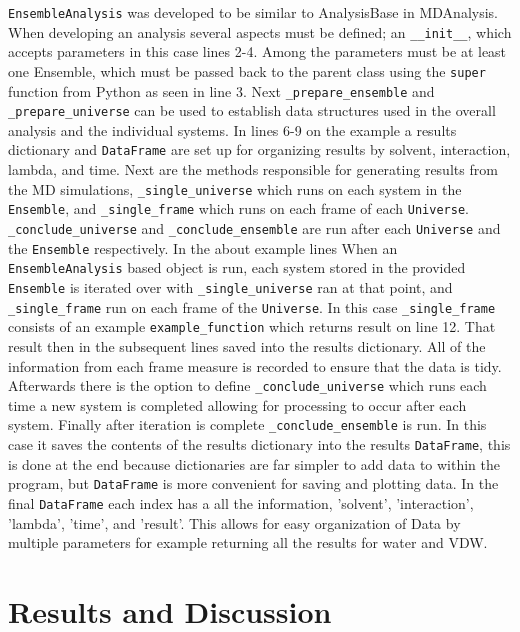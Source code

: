 \documentclass{article}[letterpaper, margins=1in, 12pt]
\begin{document}
\texttt{EnsembleAnalysis} was developed to be similar to AnalysisBase in MDAnalysis. When developing an analysis several aspects must be defined; an \lstinline{__init__}, which accepts parameters in this case lines 2-4. Among the parameters must be at least one Ensemble, which must be passed back to the parent class using the \lstinline{super} function from Python as seen in line 3. Next \lstinline{_prepare_ensemble} and \lstinline{_prepare_universe} can be used to establish data structures used in the overall analysis and the individual systems. In lines 6-9 on the example a results dictionary and \texttt{DataFrame} are set up for organizing results by solvent, interaction, lambda, and time. Next are the methods responsible for generating results from the MD simulations, \lstinline{_single_universe} which runs on each system in the \texttt{Ensemble}, and \lstinline{_single_frame} which runs on each frame of each \texttt{Universe}. \lstinline{_conclude_universe} and \lstinline{_conclude_ensemble} are run after each \texttt{Universe} and the \texttt{Ensemble} respectively. In the about example lines When an \texttt{EnsembleAnalysis} based object is run, each system stored in the provided \texttt{Ensemble} is iterated over with \lstinline{_single_universe} ran at that point, and \lstinline{_single_frame} run on each frame of the \texttt{Universe}. In this case \lstinline{_single_frame} consists of an example \lstinline{example_function} which returns result on line 12. That result then in the subsequent lines saved into the results dictionary. All of the information from each frame measure is recorded to ensure that the data is tidy. Afterwards there is the option to define \lstinline{_conclude_universe} which runs each time a new system is completed allowing for processing to occur after each system. Finally after iteration is complete \lstinline{_conclude_ensemble} is run. In this case it saves the contents of the results dictionary into the results \texttt{DataFrame}, this is done at the end because dictionaries are far simpler to add data to within the program, but \texttt{DataFrame} is more convenient for saving and plotting data. In the final \texttt{DataFrame} each index has a all the information, 'solvent', 'interaction', 'lambda', 'time', and 'result'. This allows for easy organization of Data by multiple parameters for example returning all the results for water and VDW.

\section{Results and Discussion}
\end{document}
